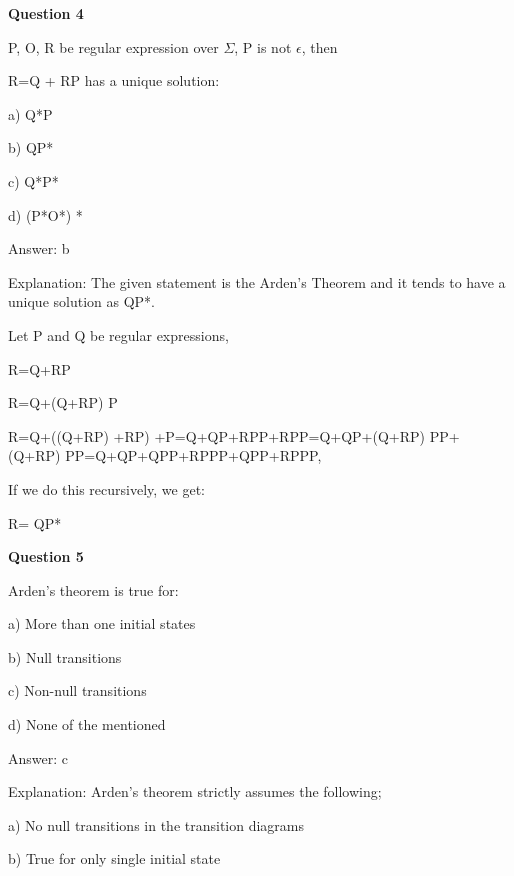 \documentclass{article}
\begin{document}
\begin{mdframed}[linewidth=1pt, roundcorner=5pt, linecolor=gray!30, backgroundcolor=gray!5]
\textbf{Question 4} 

P, O, R be regular expression over $\Sigma$, P is not $\epsilon$, then

R=Q + RP has a unique solution:

a) Q*P

b) QP*

c) Q*P*

d) (P*O*) *
\vspace{5pt} \par
\begin{tcolorbox}[colback=green!5, colframe=green!40!black, title=Solution]
Answer: b

Explanation: The given statement is the Arden's Theorem and it tends to have a unique solution as QP*.

Let P and Q be regular expressions,

R=Q+RP

R=Q+(Q+RP) P

R=Q+((Q+RP) +RP) +P=Q+QP+RPP+RPP=Q+QP+(Q+RP) PP+(Q+RP) PP=Q+QP+QPP+RPPP+QPP+RPPP,

If we do this recursively, we get:

R= QP*
\end{tcolorbox}
\end{mdframed}

\begin{mdframed}[linewidth=1pt, roundcorner=5pt, linecolor=gray!30, backgroundcolor=gray!5]
\textbf{Question 5} 

Arden's theorem is true for:

a) More than one initial states

b) Null transitions

c) Non-null transitions

d) None of the mentioned
\vspace{5pt} \par
\begin{tcolorbox}[colback=green!5, colframe=green!40!black, title=Solution]
Answer: c

Explanation: Arden's theorem strictly assumes the following;

a) No null transitions in the transition diagrams

b) True for only single initial state
\end{tcolorbox}
\end{mdframed}
\end{document}
